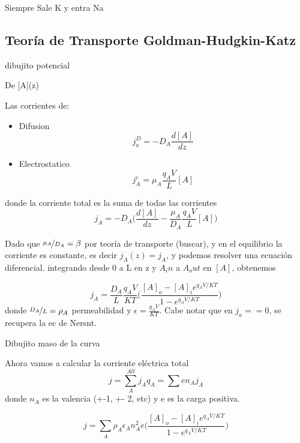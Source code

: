 Siempre Sale K y entra Na

\subsection{Teoría de Transporte Goldman-Hudgkin-Katz}

dibujito potencial

De [A](z)

Las corrientes de:
\begin{itemize}
	\item Difusion 
\begin{equation}
	j_a^D= - D_A \frac{d[A]}{dz}
\end{equation}
	\item Electrostatico
\begin{equation}
	j_A^e = \mu_A \frac{q_A V}{L}[A]
\end{equation}
\end{itemize}
donde la corriente total es la suma de todas las corrientes
\begin{equation}
 	j_A = - D_A \bigg( \frac{d[A]}{dz} - \frac{\mu_A}{D_A} \frac{q_A V}{L}[A] \bigg)
 \end{equation} 

Dado que $\nicefrac{\mu_A}{D_A} =\beta$ por teoría de transporte (buscar), y  en el equilibrio la corriente es constante, es decir $j_A(z) = j_A$, y podemos resolver una ecuación diferencial.  integrando desde 0 a L en z y $A_in$ a $A_out$ en $[A]$, obtenemos

\begin{equation}
	j_A = \frac{D_A}{L} \frac{q_AV}{KT} \bigg(\frac{[A]_o - [A]_i e^{q_A V / KT}}{1 - e^{q_A V / KT} }\bigg)
\end{equation}
donde $\nicefrac{D_A}{L} = \rho_A$ permeabilidad y $\epsilon = \frac{q_AV}{KT}  $. Cabe notar que en $j_a==0$, se recupera la ec de Nersnt. 

Dibujito maso de la curva

Ahora vamos a calcular la corriente eléctrica total 
\begin{equation}
	j = \sum^{All}_A j_A q_A = \sum e n_A j_A
\end{equation}
donde $n_A$ es la valencia (+-1, +- 2, etc) y e es la carga positiva.

\begin{equation}
	j = \sum_A \rho_A \epsilon_A n_A^2 e \bigg(\frac{[A]_o - [A]_i e^{q_A V / KT}}{1 - e^{q_A V / KT} }\bigg) 
\end{equation}

